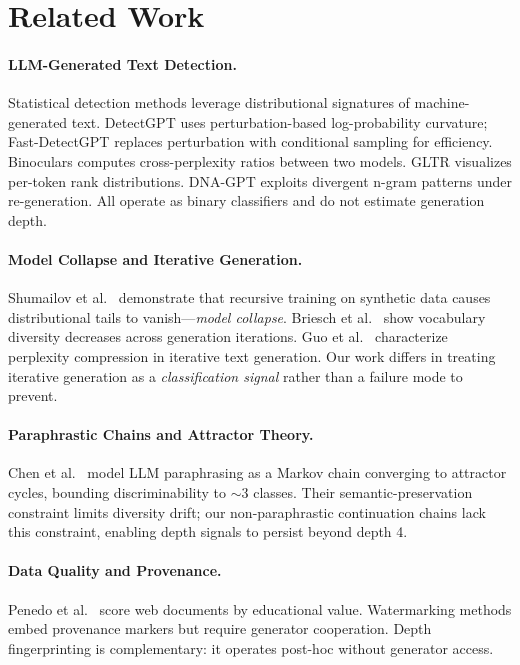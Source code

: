 \documentclass[11pt,a4paper]{article}
\begin{document}
\section{Related Work}

\paragraph{LLM-Generated Text Detection.}
Statistical detection methods leverage distributional signatures of machine-generated text.
DetectGPT \cite{mitchell2023detectgpt} uses perturbation-based log-probability curvature; Fast-DetectGPT \cite{bao2024fastdetectgpt} replaces perturbation with conditional sampling for efficiency.
Binoculars \cite{hans2024binoculars} computes cross-perplexity ratios between two models.
GLTR \cite{gehrmann2019gltr} visualizes per-token rank distributions.
DNA-GPT \cite{yang2024dna} exploits divergent n-gram patterns under re-generation.
All operate as binary classifiers and do not estimate generation depth.

\paragraph{Model Collapse and Iterative Generation.}
Shumailov et al.\ \cite{shumailov2024model} demonstrate that recursive training on synthetic data causes distributional tails to vanish---\emph{model collapse}.
Briesch et al.\ \cite{briesch2023large} show vocabulary diversity decreases across generation iterations.
Guo et al.\ \cite{guo2024curious} characterize perplexity compression in iterative text generation.
Our work differs in treating iterative generation as a \emph{classification signal} rather than a failure mode to prevent.

\paragraph{Paraphrastic Chains and Attractor Theory.}
Chen et al.\ \cite{chen2025llm} model LLM paraphrasing as a Markov chain converging to attractor cycles, bounding discriminability to $\sim$3 classes.
Their semantic-preservation constraint limits diversity drift; our non-paraphrastic continuation chains lack this constraint, enabling depth signals to persist beyond depth 4.

\paragraph{Data Quality and Provenance.}
Penedo et al.\ \cite{penedo2024fineweb} score web documents by educational value.
Watermarking methods \cite{kirchenbauer2023watermark} embed provenance markers but require generator cooperation.
Depth fingerprinting is complementary: it operates post-hoc without generator access.
\end{document}

